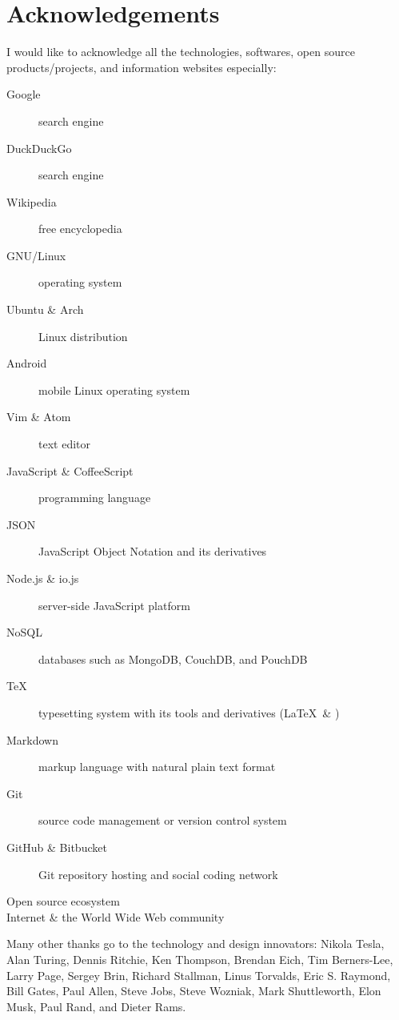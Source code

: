 
\begingroup
\let\clearpage\relax
\let\cleardoublepage\relax

\chapter{Acknowledgements}
\label{chap:acknowledgements}

I would like to acknowledge all the technologies, softwares, open source products/projects, and information websites especially:

\begin{description}
  \item[Google] search engine
  \item[DuckDuckGo] search engine
  \item[Wikipedia] free encyclopedia
  \item[GNU/Linux] operating system
  \item[Ubuntu \& Arch] Linux distribution
  \item[Android] mobile Linux operating system
  \item[Vim \& Atom] text editor
  \item[JavaScript \& CoffeeScript] programming language
  \item[JSON] JavaScript Object Notation and its derivatives
  \item[Node.js \& io.js] server-side JavaScript platform
  \item[NoSQL] databases such as MongoDB, CouchDB, and PouchDB
  \item[TeX] typesetting system with its tools and derivatives (\LaTeX \ \& \XeTeX)
  \item[Markdown] markup language with natural plain text format
  \item[Git] source code management or version control system
  \item[GitHub \& Bitbucket] Git repository hosting and social coding network
  \item[Open source ecosystem]
  \item[Internet \& the World Wide Web community]
\end{description}

\noindent Many other thanks go to the technology and design innovators: Nikola Tesla, Alan Turing, Dennis Ritchie, Ken Thompson, Brendan Eich, Tim Berners-Lee, Larry Page, Sergey Brin, Richard Stallman, Linus Torvalds, Eric S. Raymond, Bill Gates, Paul Allen, Steve Jobs, Steve Wozniak, Mark Shuttleworth, Elon Musk, Paul Rand, and Dieter Rams.

\endgroup
